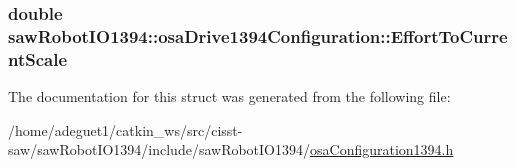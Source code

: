 \hypertarget{structsaw_robot_i_o1394_1_1osa_drive1394_configuration_a8b80905fd42053724c4472214064331d}{
\subsubsection[{Effort\-To\-Current\-Scale}]{\setlength{\rightskip}{0pt plus 5cm}double saw\-Robot\-I\-O1394\-::osa\-Drive1394\-Configuration\-::\-Effort\-To\-Current\-Scale}}\label{structsaw_robot_i_o1394_1_1osa_drive1394_configuration_a8b80905fd42053724c4472214064331d}


The documentation for this struct was generated from the following file\-:\begin{DoxyCompactItemize}
\item 
/home/adeguet1/catkin\-\_\-ws/src/cisst-\/saw/saw\-Robot\-I\-O1394/include/saw\-Robot\-I\-O1394/\hyperlink{osa_configuration1394_8h}{osa\-Configuration1394.\-h}\end{DoxyCompactItemize}
